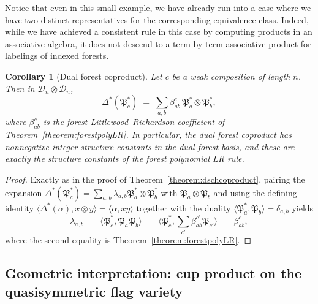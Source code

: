 \documentclass{amsart}
\newtheorem{corollary}[lemma]{Corollary}
\theoremstyle{definition}
\theoremstyle{remark}
\numberwithin{equation}{subsection}
\newcommand{\dcoma}{\mathcal{D}}
\newcommand{\forest}{\mathfrak{P}}
\begin{document}
Notice that even in this small example, we have already run into a case where we have two distinct representatives for the corresponding equivalence class. Indeed, while we have achieved a consistent rule in this case by computing products in an associative algebra, it does not descend to a term-by-term associative product for labelings of indexed forests.


\begin{corollary}[Dual forest coproduct]\label{corollary:dforestcoproduct}
Let $c$ be a weak composition of length $n$. Then in $\dcoma_n\otimes\dcoma_n$,
$$\Delta^*(\forest_c^*) \;=\; \sum_{a,b}\beta_{ab}^c\,\forest_a^*\otimes\forest_b^*,$$
where $\beta_{ab}^c$ is the forest Littlewood--Richardson coefficient of Theorem~\ref{theorem:forestpolyLR}. In particular, the dual forest coproduct has nonnegative integer structure constants in the dual forest basis, and these are exactly the structure constants of the forest polynomial LR rule.
\end{corollary}
\begin{proof}
Exactly as in the proof of Theorem~\ref{theorem:dschcoproduct}, pairing the expansion $\Delta^*(\forest_c^*) = \sum_{a,b}\lambda_{a,b}\forest_a^*\otimes\forest_b^*$ with $\forest_a\otimes\forest_b$ and using the defining identity $\langle\Delta^*(\alpha),x\otimes y\rangle = \langle \alpha, xy\rangle$ together with the duality $\langle \forest_a^*,\forest_b\rangle = \delta_{a,b}$ yields
$$\lambda_{a,b}\;=\;\langle \forest_c^*,\forest_a\forest_b\rangle\;=\;\langle \forest_c^*,\textstyle\sum_{c'}\beta_{ab}^{c'}\forest_{c'}\rangle\;=\;\beta_{ab}^c,$$
where the second equality is Theorem~\ref{theorem:forestpolyLR}.
\end{proof}



\subsection{Geometric interpretation: cup product on the quasisymmetric flag variety}\label{subsection:qflbranch}
\end{document}

